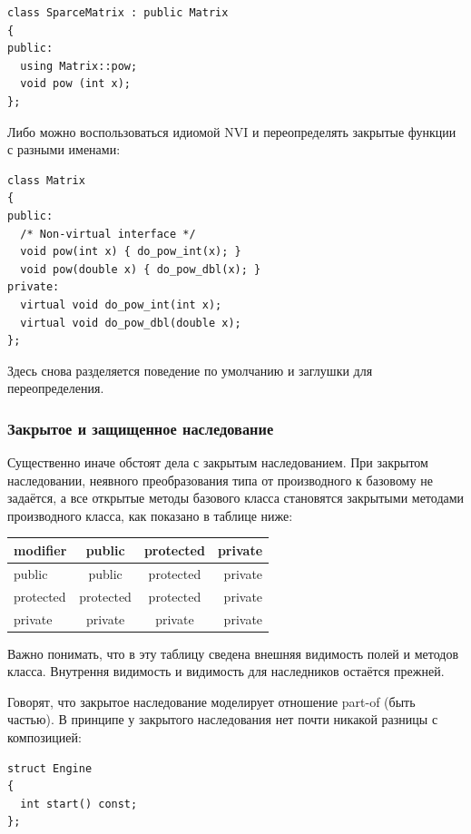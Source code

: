 \documentclass[a4paper,12pt,oneside]{article}
\begin{document}
\begin{lstlisting}
class SparceMatrix : public Matrix
{
public:
  using Matrix::pow;
  void pow (int x);
};
\end{lstlisting}

Либо можно воспользоваться идиомой NVI и переопределять закрытые функции с разными именами:

\begin{lstlisting}
class Matrix
{
public:
  /* Non-virtual interface */
  void pow(int x) { do_pow_int(x); }
  void pow(double x) { do_pow_dbl(x); }
private:
  virtual void do_pow_int(int x);
  virtual void do_pow_dbl(double x);
};
\end{lstlisting}

Здесь снова разделяется поведение по умолчанию и заглушки для переопределения.

\subsubsection{Закрытое и защищенное наследование}\label{OtherInheritance}

Существенно иначе обстоят дела с закрытым наследованием. При закрытом наследовании, неявного преобразования типа от производного к базовому не задаётся, а все открытые методы базового класса становятся закрытыми методами производного класса, как показано в таблице ниже:

\begin{center}
  \begin{tabular}{ | l | c | c | r | }
    \hline
    modifier & public & protected & private \\ \hline \hline
    public & public & protected & private \\ \hline
    protected & protected & protected & private \\ \hline
    private & private & private & private \\ \hline
  \end{tabular}
\end{center}

Важно понимать, что в эту таблицу сведена внешняя видимость полей и методов класса. Внутрення видимость и видимость для наследников остаётся прежней.

Говорят, что закрытое наследование моделирует отношение part-of (быть частью). В принципе у закрытого наследования нет почти никакой разницы с композицией:

\begin{lstlisting}
struct Engine
{
  int start() const;
};
\end{lstlisting}
\end{document}
